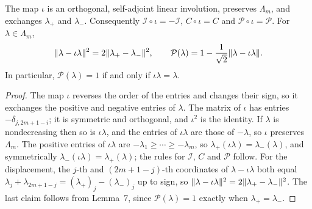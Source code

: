 \begin{lemma}
\label{lem:involution}
\leanok
{}
The map $\iota$ is an orthogonal, self-adjoint linear involution,
preserves $\Lambda_m$, and exchanges $\lambda_+$ and $\lambda_-$.
Consequently $\mathcal I\circ\iota=-\mathcal I$, $C\circ\iota=C$ and
$\mathcal P\circ\iota=\mathcal P$. For $\lambda\in\Lambda_m$,
\[
 \lVert \lambda-\iota\lambda\rVert^2=2\lVert \lambda_+-\lambda_-\rVert^2,\qquad
 \mathcal P(\lambda)=1-\frac1{\sqrt2}\lVert \lambda-\iota\lambda\rVert.
\]
In particular, $\mathcal P(\lambda)=1$ if and only if $\iota\lambda=\lambda$.
\end{lemma}
\begin{proof}
\leanok
{}
The map $\iota$ reverses the order of the entries and changes their sign,
so it exchanges the positive and negative entries of $\lambda$. The
matrix of $\iota$ has entries $-\delta_{j,2m+1-i}$; it is symmetric
and orthogonal, and $\iota^2$ is the identity. If $\lambda$ is
nondecreasing then so is $\iota\lambda$, and the entries of
$\iota\lambda$ are those of $-\lambda$, so $\iota$ preserves $\Lambda_m$.
The positive entries of $\iota\lambda$ are
$-\lambda_1\ge\cdots\ge-\lambda_m$, so $\lambda_+(\iota\lambda)=\lambda_-(\lambda)$,
and symmetrically $\lambda_-(\iota\lambda)=\lambda_+(\lambda)$; the rules
for $\mathcal I$, $C$ and $\mathcal P$ follow. For the displacement, the
$j$-th and $(2m+1-j)$-th coordinates of $\lambda-\iota\lambda$ both equal
$\lambda_j+\lambda_{2m+1-j}=(\lambda_+)_j-(\lambda_-)_j$ up to sign, so
$\lVert \lambda-\iota\lambda\rVert^2=2\lVert \lambda_+-\lambda_-\rVert^2$. The last
claim follows from Lemma~7, since $\mathcal P(\lambda)=1$ exactly when
$\lambda_+=\lambda_-$.
\end{proof}

